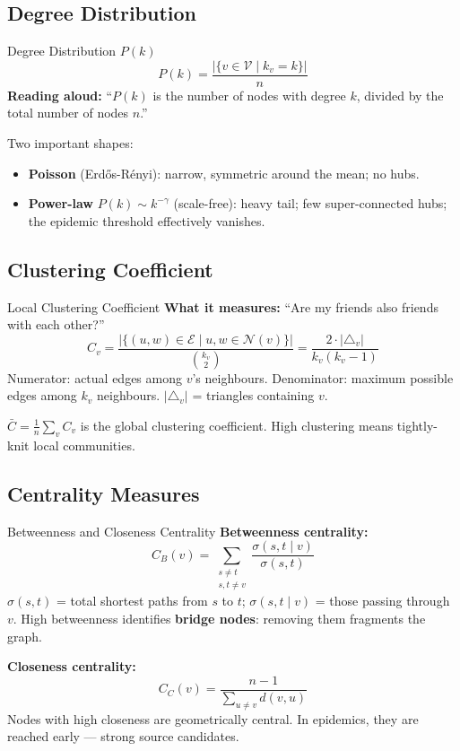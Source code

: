 \subsection{Degree Distribution}

\begin{conceptbox}{Degree Distribution $P(k)$}
\[
P(k) = \frac{|\{v \in \mathcal{V} \mid k_v = k\}|}{n}
\]
\textbf{Reading aloud:} ``$P(k)$ is the number of nodes with degree $k$, divided by the total number of nodes $n$.''

Two important shapes:
\begin{itemize}[noitemsep]
    \item \textbf{Poisson} (Erd\H{o}s-R\'enyi): narrow, symmetric around the mean; no hubs.
    \item \textbf{Power-law} $P(k) \sim k^{-\gamma}$ (scale-free): heavy tail; few super-connected hubs; the epidemic threshold effectively vanishes.
\end{itemize}
\end{conceptbox}

\subsection{Clustering Coefficient}

\begin{mathbox}{Local Clustering Coefficient}
\textbf{What it measures:} ``Are my friends also friends with each other?''
\[
C_v = \frac{|\{(u,w) \in \mathcal{E} \mid u,w \in \mathcal{N}(v)\}|}{\binom{k_v}{2}} = \frac{2 \cdot |\triangle_v|}{k_v(k_v-1)}
\]
Numerator: actual edges among $v$'s neighbours. Denominator: maximum possible edges among $k_v$ neighbours. $|\triangle_v|$ = triangles containing $v$.

$\bar{C} = \frac{1}{n}\sum_v C_v$ is the global clustering coefficient. High clustering means tightly-knit local communities.
\end{mathbox}

\subsection{Centrality Measures}

\begin{mathbox}{Betweenness and Closeness Centrality}
\textbf{Betweenness centrality:}
\[
C_B(v) = \sum_{\substack{s \neq t \\ s,t \neq v}} \frac{\sigma(s,t \mid v)}{\sigma(s,t)}
\]
$\sigma(s,t)$ = total shortest paths from $s$ to $t$; $\sigma(s,t \mid v)$ = those passing through $v$.
High betweenness identifies \textbf{bridge nodes}: removing them fragments the graph.

\textbf{Closeness centrality:}
\[
C_C(v) = \frac{n-1}{\sum_{u \neq v} d(v,u)}
\]
Nodes with high closeness are geometrically central. In epidemics, they are reached early --- strong source candidates.
\end{mathbox}

